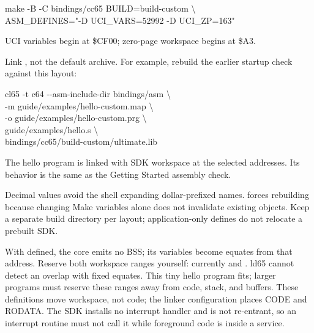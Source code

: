 \begin{listingbox}
make -B -C bindings/cc65 BUILD=build-custom \textbackslash\\
\hspace*{1em}ASM\_DEFINES="-D UCI\_VARS=52992 -D UCI\_ZP=163"
\end{listingbox}

\begin{resultbox}
UCI variables begin at \$CF00; zero-page workspace begins at \$A3.
\end{resultbox}

Link , not the default archive.
For example, rebuild the earlier startup check against this layout:
\begin{listingbox}
cl65 -t c64 -{}-asm-include-dir bindings/asm \textbackslash\\
\hspace*{1em}-m guide/examples/hello-custom.map \textbackslash\\
\hspace*{1em}-o guide/examples/hello-custom.prg \textbackslash\\
\hspace*{1em}guide/examples/hello.s \textbackslash\\
\hspace*{1em}bindings/cc65/build-custom/ultimate.lib
\end{listingbox}

\begin{resultbox}
The hello program is linked with SDK workspace at the selected addresses.
Its behavior is the same as the Getting Started assembly check.
\end{resultbox}

Decimal values avoid the shell expanding dollar-prefixed names. 
forces rebuilding because changing Make variables alone does not invalidate
existing objects. Keep a separate build directory per layout; application-only
defines do not relocate a prebuilt SDK.

With  defined, the core emits no BSS; its variables become
equates from that address. Reserve both workspace ranges yourself: currently
 and . ld65 cannot detect an overlap with
fixed equates. This tiny hello program fits; larger programs must reserve these
ranges away from code, stack, and buffers. These definitions move workspace,
not code; the linker configuration places CODE and RODATA.
The SDK installs no interrupt handler and is not
re-entrant, so an interrupt routine must not call it while foreground code is
inside a service.


